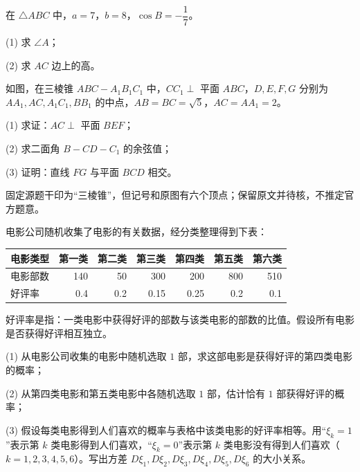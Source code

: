 \begin{question}
在 $\triangle ABC$ 中，$a=7$，$b=8$，$\cos B=-\dfrac17$。

(1) 求 $\angle A$；

(2) 求 $AC$ 边上的高。

\Needspace{0.4\textheight}
\end{question}
\begin{question}
如图，在三棱锥 $ABC-A_1B_1C_1$ 中，$CC_1\perp$ 平面 $ABC$，$D,E,F,G$ 分别为 $AA_1,AC,A_1C_1,BB_1$ 的中点，$AB=BC=\sqrt5$，$AC=AA_1=2$。

(1) 求证：$AC\perp$ 平面 $BEF$；

(2) 求二面角 $B-CD-C_1$ 的余弦值；

(3) 证明：直线 $FG$ 与平面 $BCD$ 相交。
\nopagebreak[4]
\begin{center}\end{center}
\nopagebreak[4]
\begin{gktip}
固定源题干印为“三棱锥”，但记号和原图有六个顶点；保留原文并待核，不推定官方题意。
\end{gktip}

\end{question}
\begin{question}
电影公司随机收集了电影的有关数据，经分类整理得到下表：

\begin{center}
\begin{tabular}{lrrrrrr}
\toprule
电影类型 & 第一类 & 第二类 & 第三类 & 第四类 & 第五类 & 第六类 \\
\midrule
电影部数 & 140 & 50 & 300 & 200 & 800 & 510 \\
好评率 & 0.4 & 0.2 & 0.15 & 0.25 & 0.2 & 0.1 \\
\bottomrule
\end{tabular}
\end{center}

好评率是指：一类电影中获得好评的部数与该类电影的部数的比值。假设所有电影是否获得好评相互独立。

(1) 从电影公司收集的电影中随机选取 $1$ 部，求这部电影是获得好评的第四类电影的概率；

(2) 从第四类电影和第五类电影中各随机选取 $1$ 部，估计恰有 $1$ 部获得好评的概率；

(3) 假设每类电影得到人们喜欢的概率与表格中该类电影的好评率相等。用“$\xi_k=1$”表示第 $k$ 类电影得到人们喜欢，“$\xi_k=0$”表示第 $k$ 类电影没有得到人们喜欢（$k=1,2,3,4,5,6$）。写出方差 $D\xi_1,D\xi_2,D\xi_3,D\xi_4,D\xi_5,D\xi_6$ 的大小关系。

\end{question}
